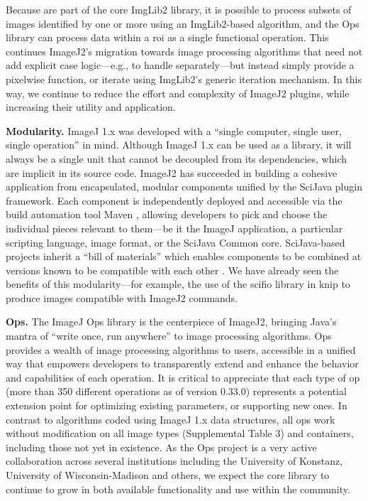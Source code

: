 \documentclass{bmcart}
\begin{document}
Because  are part of the core ImgLib2 library, it is possible
to process subsets of images identified by one or more  using
an ImgLib2-based algorithm, and the Ops library can process data within a
\acrshort{roi} as a single functional operation. This continues ImageJ2's
migration towards image processing algorithms that need not add explicit case
logic---e.g., to handle  separately---but instead simply
provide a pixelwise function, or iterate using ImgLib2's generic iteration
mechanism. In this way, we continue to reduce the effort and complexity of
ImageJ2 plugins, while increasing their utility and application.

\textbf{Modularity.} ImageJ 1.x was developed with a ``single computer, single
user, single operation'' in mind. Although ImageJ 1.x can be used as a library,
it will always be a single unit that cannot be decoupled from its dependencies,
which are implicit in its source code. ImageJ2 has succeeded in building a
cohesive application from encapsulated, modular components unified by the
SciJava plugin framework. Each component is independently deployed and
accessible via the build automation tool Maven \cite{apache_maven}, allowing
developers to pick and choose the individual pieces relevant to them---be it
the ImageJ application, a particular scripting language, image format, or the
SciJava Common core. SciJava-based projects inherit a ``bill of materials''
which enables components to be combined at versions known to be compatible with
each other \cite{imagej_architecture}. We have already seen the benefits of
this modularity---for example, the use of the \acrshort{scifio} library in
\acrfull{knip} to produce images compatible with ImageJ2 commands.

\textbf{Ops.} The ImageJ Ops library is the centerpiece of ImageJ2, bringing
Java's mantra of ``write once, run anywhere'' to image processing algorithms.
Ops provides a wealth of image processing algorithms to users, accessible in a
unified way that empowers developers to transparently extend and enhance the
behavior and capabilities of each operation. It is critical to appreciate that
each type of op (more than 350 different operations as of version 0.33.0)
represents a potential extension point for optimizing existing parameters, or
supporting new ones. In contrast to algorithms coded using ImageJ 1.x data
structures, all ops work without modification on all image types (Supplemental
Table 3) and containers, including those not yet in existence. As the Ops
project is a very active collaboration across several institutions including
the University of Konstanz, University of Wisconsin-Madison and others, we
expect the core library to continue to grow in both available functionality and
use within the community.
\end{document}
